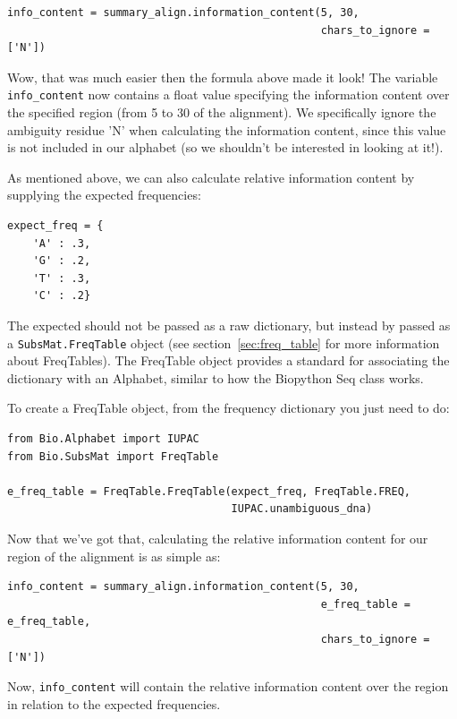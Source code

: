 \documentclass{report}
\begin{document}
\begin{verbatim}
info_content = summary_align.information_content(5, 30, 
                                                 chars_to_ignore = ['N'])
\end{verbatim}

Wow, that was much easier then the formula above made it look! The variable \verb|info_content| now contains a float value specifying the information content over the specified region (from 5 to 30 of the alignment). We specifically ignore the ambiguity residue 'N' when calculating the information content, since this value is not included in our alphabet (so we shouldn't be interested in looking at it!).


As mentioned above, we can also calculate relative information content by supplying the expected frequencies:

\begin{verbatim}
expect_freq = {
    'A' : .3,
    'G' : .2,
    'T' : .3,
    'C' : .2}
\end{verbatim}

The expected should not be passed as a raw dictionary, but instead by passed as a \verb|SubsMat.FreqTable| object (see section~\ref{sec:freq_table} for more information about FreqTables). The FreqTable object provides a standard for associating the dictionary with an Alphabet, similar to how the Biopython Seq class works. 


To create a FreqTable object, from the frequency dictionary you just need to do:

\begin{verbatim}
from Bio.Alphabet import IUPAC
from Bio.SubsMat import FreqTable

e_freq_table = FreqTable.FreqTable(expect_freq, FreqTable.FREQ,
                                   IUPAC.unambiguous_dna)
\end{verbatim}

Now that we've got that, calculating the relative information content for our region of the alignment is as simple as:


\begin{verbatim}
info_content = summary_align.information_content(5, 30,
                                                 e_freq_table = e_freq_table,
                                                 chars_to_ignore = ['N'])
\end{verbatim}

Now, \verb|info_content| will contain the relative information content over the region in relation to the expected frequencies.
\end{document}
